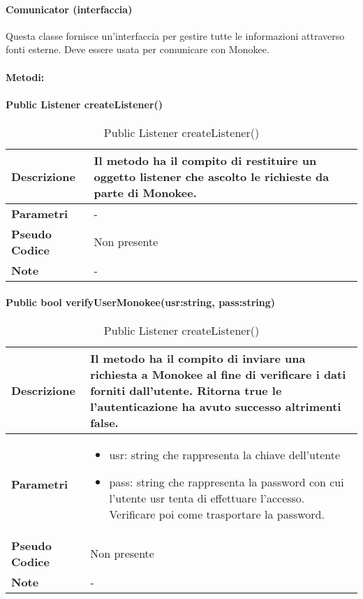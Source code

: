 \paragraph{Comunicator (interfaccia)}
Questa classe fornisce un’interfaccia per gestire tutte le informazioni attraverso fonti esterne. Deve essere usata per comunicare con Monokee.
\paragraph{Metodi:}

\paragraph{Public Listener createListener()}
\begin{center}
    \begin{longtable}{|p{3cm}|p{9cm}|}%
    \caption{Public Listener createListener()}
    \label{tab:public-void-createListener}
    \endfirsthead
    \endhead
    \hline
    \textbf{Descrizione} & Il metodo ha il compito di restituire un oggetto listener che ascolto le richieste da parte di Monokee.\\
    \hline
    \textbf{Parametri} &  - \\
    \hline
    \textbf{Pseudo Codice} & Non presente \\
    \hline
    \textbf{Note} & - \\
    \hline
    \end{longtable}
    \end{center}


\paragraph{Public bool verifyUserMonokee(usr:string, pass:string)}
\begin{center}
    \begin{longtable}{|p{3cm}|p{9cm}|}%
    \caption{Public Listener createListener()}
    \label{tab:public-bool-verifyUserMonokee}
    \endfirsthead
    \endhead
    \hline
    \textbf{Descrizione} & Il metodo ha il compito di inviare una richiesta a Monokee al fine di verificare i dati forniti dall’utente. Ritorna true le l’autenticazione ha avuto successo altrimenti false.\\
    \hline
    \textbf{Parametri} &      
        \begin{itemize}
            \item usr: string che rappresenta la chiave dell’utente
            \item pass: string che rappresenta la password con cui l’utente usr tenta di effettuare l’accesso. Verificare poi come trasportare la password.
        \end{itemize}
    \\
    \hline
    \textbf{Pseudo Codice} & Non presente \\
    \hline
    \textbf{Note} & - \\
    \hline
    \end{longtable}
    \end{center}






